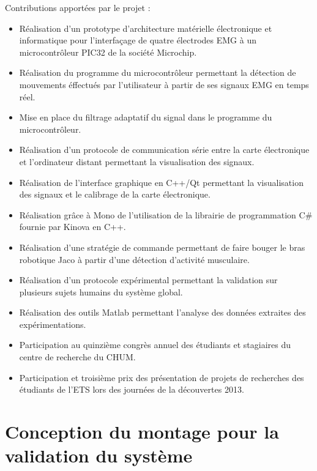 \documentclass[letterpaper, twoside, 12pt, memoire, creativecommons, hyperref]{thETS}
\begin{document}
\begin{contributions}

Contributions apportées par le projet :

\begin{itemize}
 \item Réalisation d'un prototype d'architecture matérielle électronique et informatique pour l'interfaçage de quatre électrodes EMG à un microcontrôleur PIC32 de la société Microchip.
 \item Réalisation du programme du microcontrôleur permettant la détection de mouvements éffectués par l'utilisateur à partir de ses signaux EMG en temps réel.
 \item Mise en place du filtrage adaptatif du signal dans le programme du microcontrôleur.
 \item Réalisation d'un protocole de communication série entre la carte électronique et l'ordinateur distant permettant la visualisation des signaux.
 \item Réalisation de l'interface graphique en C++/Qt permettant la visualisation des signaux et le calibrage de la carte électronique.
 \item Réalisation grâce à Mono de l'utilisation de la librairie de programmation C\# fournie par Kinova en C++.
 \item Réalisation d'une stratégie de commande permettant de faire bouger le bras robotique Jaco à partir d'une détection d'activité musculaire.
 \item Réalisation d'un protocole expérimental permettant la validation sur plusieurs sujets humains du système global.
 \item Réalisation des outils Matlab permettant l'analyse des données extraites des expérimentations.
 \item Participation au quinzième congrès annuel des étudiants et stagiaires du centre de recherche du CHUM.
 \item Participation et troisième prix des présentation de projets de recherches des étudiants de l'ETS lors des journées de la découvertes 2013.
\end{itemize}

\end{contributions}


\appendix


\multiannexe %
%
\chapter{Conception du montage pour la validation du système} 
\label{annexemontage}
\end{document}
